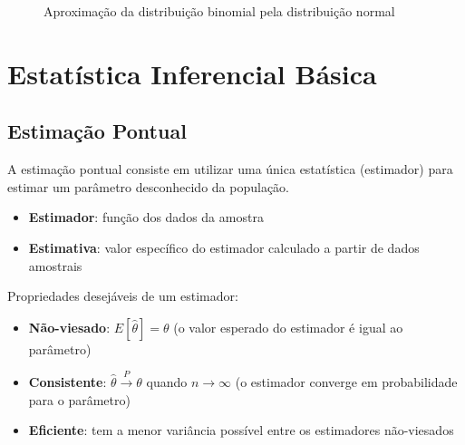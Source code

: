 \documentclass[a4paper,12pt]{article}
\begin{document}
\begin{figure}[H]
\centering
{}
\caption{Aproximação da distribuição binomial pela distribuição normal}
\end{figure}

\section{Estatística Inferencial Básica}

\subsection{Estimação Pontual}

A estimação pontual consiste em utilizar uma única estatística (estimador) para estimar um parâmetro desconhecido da população.

\begin{itemize}
    \item \textbf{Estimador}: função dos dados da amostra
    \item \textbf{Estimativa}: valor específico do estimador calculado a partir de dados amostrais
\end{itemize}

Propriedades desejáveis de um estimador:
\begin{itemize}
    \item \textbf{Não-viesado}: $E[\hat{\theta}] = \theta$ (o valor esperado do estimador é igual ao parâmetro)
    \item \textbf{Consistente}: $\hat{\theta} \xrightarrow{P} \theta$ quando $n \to \infty$ (o estimador converge em probabilidade para o parâmetro)
    \item \textbf{Eficiente}: tem a menor variância possível entre os estimadores não-viesados
\end{itemize}
\end{document}
